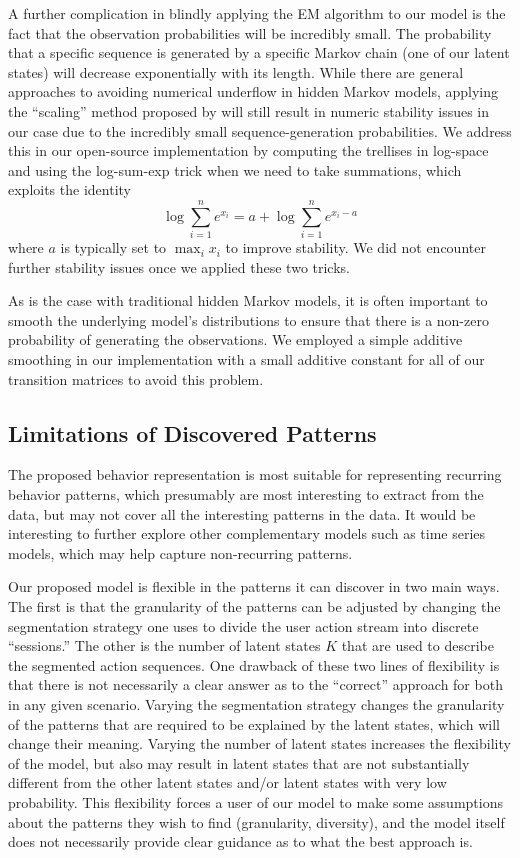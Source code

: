 A further complication in blindly applying the EM algorithm to our model is
the fact that the observation probabilities will be incredibly small. The
probability that a specific sequence is generated by a specific Markov
chain (one of our latent states) will decrease exponentially with its
length. While there are general approaches to avoiding numerical underflow
in hidden Markov models, applying the ``scaling'' method proposed by
\citet{Rabiner:1990:RSR} will still result in numeric stability issues in
our case due to the incredibly small sequence-generation probabilities. We
address this in our open-source implementation by computing the trellises
in log-space and using the log-sum-exp trick when we need to take
summations, which exploits the identity
\begin{equation}
    \log \sum_{i=1}^n e^{x_i} = a + \log \sum_{i=1}^n e^{x_i - a}
\end{equation}
where $a$ is typically set to $\max_i x_i$ to improve stability. We did not
encounter further stability issues once we applied these two tricks.

As is the case with traditional hidden Markov models, it is often important
to smooth the underlying model's distributions to ensure that there is a
non-zero probability of generating the observations. We employed a simple
additive smoothing in our implementation with a small additive constant for
all of our transition matrices to avoid this problem.

\subsection{Limitations of Discovered Patterns}

The proposed behavior representation is most suitable for representing
recurring behavior patterns, which presumably are most interesting
to extract from the data, but may not cover all the interesting patterns in the data.
It would be interesting to further explore other complementary models such as
 time series models, which may help capture non-recurring patterns.

Our proposed model is flexible in the patterns it can discover in two main
ways. The first is that the granularity of the patterns can be adjusted by
changing the segmentation strategy one uses to divide the user action
stream into discrete ``sessions.'' The other is the number of latent
states $K$ that are used to describe the segmented action sequences. One
drawback of these two lines of flexibility is that there is not necessarily
a clear answer as to the ``correct'' approach for both in any given
scenario. Varying the segmentation strategy changes the granularity of the
patterns that are required to be explained by the latent states, which will
change their meaning. Varying the number of latent states increases the
flexibility of the model, but also may result in latent states that are not
substantially different from the other latent states and/or latent states
with very low probability. This flexibility forces a user of our model to
make some assumptions about the patterns they wish to find (granularity,
diversity), and the model itself does not necessarily provide clear
guidance as to what the best approach is.

